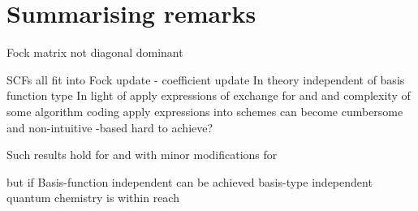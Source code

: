 \section{Summarising remarks}


Fock matrix not diagonal dominant

SCFs all fit into Fock update - coefficient update
In theory independent of basis function type
In light of apply expressions of exchange for \FE and \CS
and complexity of some \SCF algorithm 
coding apply expressions into \SCF schemes can become cumbersome
and non-intuitive
\contract-based \SCF hard to achieve?

Such results hold for \HF and with minor modifications for \DFT

but if Basis-function independent \SCF can be achieved
basis-type independent quantum chemistry is within reach

